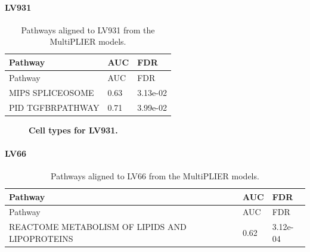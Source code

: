 \documentclass[
  a4paper,
]{article}
\newenvironment{fignos:tagged-figure}[1][]{
  \let\oldfigurename\figurename
  \renewcommand{\figurename}{Supplementary Figure}
}{
  \let\figurename\oldfigurename
}
\newenvironment{tablenos:tagged-table}[1][]{
  \let\oldtablename\tablename
  \renewcommand{\tablename}{Supplementary Table}
}{
  \let\tablename\oldtablename
}
\begin{document}
\clearpage

\hypertarget{lv931}{%
\paragraph{LV931}\label{lv931}}

\begin{tablenos:tagged-table}[S10]

\begin{longtable}[]{@{}lll@{}}
\caption{Pathways aligned to LV931 from the MultiPLIER models.
\label{tbl:sup:multiplier_pathways:lv931}}\label{tbl:sup:multiplier_pathways:lv931}\tabularnewline
\toprule()
Pathway & AUC & FDR \\
\midrule()
\endfirsthead
\toprule()
Pathway & AUC & FDR \\
\midrule()
\endhead
MIPS SPLICEOSOME & 0.63 & 3.13e-02 \\
PID TGFBRPATHWAY & 0.71 & 3.99e-02 \\
\bottomrule()
\end{longtable}

\end{tablenos:tagged-table}

\begin{fignos:tagged-figure}[S15]

\begin{figure}
\hypertarget{fig:sup:lv931}{%
\centering

\caption{\textbf{Cell types for LV931.}
}\label{fig:sup:lv931}
}
\end{figure}

\end{fignos:tagged-figure}

\clearpage

\hypertarget{lv66}{%
\paragraph{LV66}\label{lv66}}

\begin{tablenos:tagged-table}[S11]

\begin{longtable}[]{@{}lll@{}}
\caption{Pathways aligned to LV66 from the MultiPLIER models.
\label{tbl:sup:multiplier_pathways:lv66}}\label{tbl:sup:multiplier_pathways:lv66}\tabularnewline
\toprule()
Pathway & AUC & FDR \\
\midrule()
\endfirsthead
\toprule()
Pathway & AUC & FDR \\
\midrule()
\endhead
REACTOME METABOLISM OF LIPIDS AND LIPOPROTEINS & 0.62 & 3.12e-04 \\
\bottomrule()
\end{longtable}

\end{tablenos:tagged-table}
\end{document}
